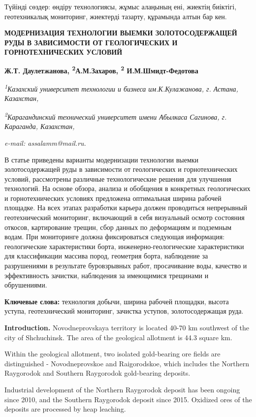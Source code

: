 Түйінді сөздер: өндіру технологиясы, жұмыс алаңының ені, жиектің
биіктігі, геотехникалық мониторинг, жиектерді тазарту, құрамында алтын
бар кен.

{\bfseries МОДЕРНИЗАЦИЯ ТЕХНОЛОГИИ ВЫЕМКИ ЗОЛОТОСОДЕРЖАЩЕЙ РУДЫ В
ЗАВИСИМОСТИ ОТ ГЕОЛОГИЧЕСКИХ И ГОРНОТЕХНИЧЕСКИХ УСЛОВИЙ}

{\bfseries Ж.Т. Даулетжанова,
\textsuperscript{2}А.М.Захаров\textsuperscript{\envelope }, \textsuperscript{2}
И.М.Шмидт-Федотова}

\emph{\textsuperscript{1}Казахский университет технологии и бизнеса
им.К.Кулажанова, г. Астана, Казахстан,}

\emph{\textsuperscript{2}Карагандинский технический университет имени
Абылкаса Сагинова, г. Караганда, Казахстан,}

\emph{e-mail: assalamm@mail.ru.}

В статье приведены варианты модернизации технологии выемки
золотосодержащей руды в зависимости от геологических и горнотехнических
условий, рассмотрены различные технологические решения для улучшения
технологий. На основе обзора, анализа и обобщения в конкретных
геологических и горнотехнических условиях предложена оптимальная ширина
рабочей площадке. На всех этапах разработки карьера должен проводиться
непрерывный геотехнический мониторинг, включающий в себя визуальный
осмотр состояния откосов, картирование трещин, сбор данных по
деформациям и подземным водам. При мониторинге должна фиксироваться
следующая информация: геологические характеристики борта,
инженерно-геологические характеристики для классификации массива пород,
геометрия борта, наблюдение за разрушениями в результате буровзрывных
работ, просачивание воды, качество и эффективность зачистки, наблюдения
за имеющимися трещинами и обрушениями.

{\bfseries Ключевые слова:} технология добычи, ширина рабочей площадки,
высота уступа, геотехнический мониторинг, зачистка уступов,
золотосодержащая руда.

{\bfseries Introduction.} Novodneprovskaya territory is located 40-70 km
southwest of the city of Shchuchinsk. The area of the geological
allotment is 44.3 square km.

Within the geological allotment, two isolated gold-bearing ore fields
are distinguished - Novodneprovskoe and Raigorodskoe, which includes the
Northern Raygorodok and Southern Raygorodok gold-bearing deposits.

Industrial development of the Northern Raygorodok deposit has been
ongoing since 2010, and the Southern Raygorodok deposit since 2015.
Oxidized ores of the deposits are processed by heap leaching.

